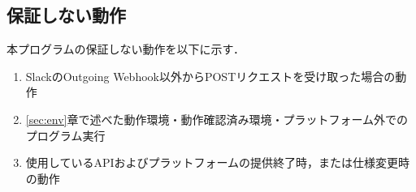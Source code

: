 \documentclass[12pt]{jsarticle}
\begin{document}
\subsection{保証しない動作}
本プログラムの保証しない動作を以下に示す．

\begin{enumerate}
\item SlackのOutgoing Webhook以外からPOSTリクエストを受け取った場合の動作
\item \ref{sec:env}章で述べた動作環境・動作確認済み環境・プラットフォーム外でのプログラム実行
\item 使用しているAPIおよびプラットフォームの提供終了時，または仕様変更時の動作
\end{enumerate}




\end{document}
